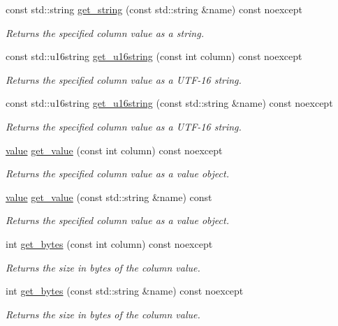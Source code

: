 \begin{DoxyCompactItemize}
const std\-::string \hyperlink{a00010_ab9c842deb81d9eb20388746672a96d29}{get\-\_\-string} (const std\-::string \&name) const noexcept
\begin{DoxyCompactList}\small\item\em Returns the specified column value as a string. \end{DoxyCompactList}\item 
const std\-::u16string \hyperlink{a00010_abfef02b657c992a2d07e28a07e41e533}{get\-\_\-u16string} (const int column) const noexcept
\begin{DoxyCompactList}\small\item\em Returns the specified column value as a U\-T\-F-\/16 string. \end{DoxyCompactList}\item 
const std\-::u16string \hyperlink{a00010_af10d3ff33e5f4ee471bc14cc41ec86c1}{get\-\_\-u16string} (const std\-::string \&name) const noexcept
\begin{DoxyCompactList}\small\item\em Returns the specified column value as a U\-T\-F-\/16 string. \end{DoxyCompactList}\item 
\hyperlink{a00015}{value} \hyperlink{a00010_af776fbdf8dc1150b628b04eca10841f4}{get\-\_\-value} (const int column) const noexcept
\begin{DoxyCompactList}\small\item\em Returns the specified column value as a value object. \end{DoxyCompactList}\item 
\hyperlink{a00015}{value} \hyperlink{a00010_ad7835e8a981450975fee7771fa863ffe}{get\-\_\-value} (const std\-::string \&name) const 
\begin{DoxyCompactList}\small\item\em Returns the specified column value as a value object. \end{DoxyCompactList}\item 
int \hyperlink{a00010_ac4404227950aca8d5f01255a5541dbb4}{get\-\_\-bytes} (const int column) const noexcept
\begin{DoxyCompactList}\small\item\em Returns the size in bytes of the column value. \end{DoxyCompactList}\item 
int \hyperlink{a00010_a315b97406b5ba48bcd14857192d88d5e}{get\-\_\-bytes} (const std\-::string \&name) const noexcept
\begin{DoxyCompactList}\small\item\em Returns the size in bytes of the column value. \end{DoxyCompactList}\item 

\end{DoxyCompactItemize}
